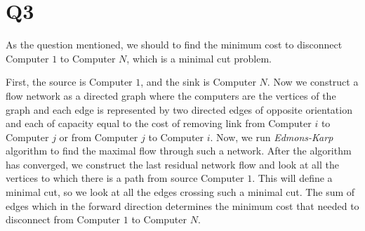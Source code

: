 \documentclass[a4paper]{article}
\begin{document}
		
	\section*{Q3}
	As the question mentioned, we should to find the minimum cost to disconnect Computer $1$ to Computer $N$, which is a minimal cut problem.
	
	First, the source is Computer $1$, and the sink is Computer $N$. Now we construct a flow network as a directed graph where the computers are the vertices of the graph and each edge is represented by two directed edges of opposite orientation and each of capacity equal to the cost of removing link from Computer $i$ to Computer $j$ or from Computer $j$ to Computer $i$. Now, we run \textit{Edmons-Karp} algorithm to find the maximal flow through such a network. After the algorithm has converged, we construct the last residual network flow and look at all the vertices to which there is a path from source Computer $1$. This will define a minimal cut, so we look at all the edges crossing such a minimal cut. The sum of edges which in the forward direction determines the minimum cost that needed to disconnect from Computer $1$ to Computer $N$. 
			
	
	
	
	
	
	
	
	
	
	
	
	
	
	
	
	
	
	
	
	
	
\end{document}
